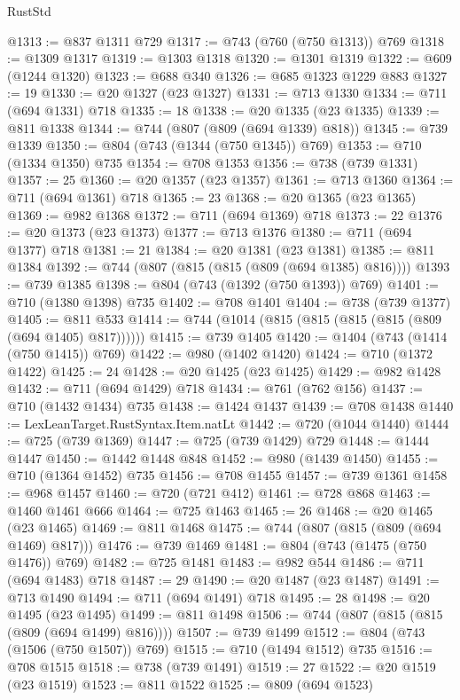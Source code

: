 \begin{lexlean}{RustStd}
\begin{coremodule}
@1313 := @837 @1311 @729
@1317 := @743 (@760 (@750 @1313)) @769
@1318 := @1309 @1317
@1319 := @1303 @1318
@1320 := @1301 @1319
@1322 := @609 (@1244 @1320)
@1323 := @688 @340
@1326 := @685 @1323 @1229 @883
@1327 := 19
@1330 := @20 @1327 (@23 @1327)
@1331 := @713 @1330
@1334 := @711 (@694 @1331) @718
@1335 := 18
@1338 := @20 @1335 (@23 @1335)
@1339 := @811 @1338
@1344 := @744 (@807 (@809 (@694 @1339) @818))
@1345 := @739 @1339
@1350 := @804 (@743 (@1344 (@750 @1345)) @769)
@1353 := @710 (@1334 @1350) @735
@1354 := @708 @1353
@1356 := @738 (@739 @1331)
@1357 := 25
@1360 := @20 @1357 (@23 @1357)
@1361 := @713 @1360
@1364 := @711 (@694 @1361) @718
@1365 := 23
@1368 := @20 @1365 (@23 @1365)
@1369 := @982 @1368
@1372 := @711 (@694 @1369) @718
@1373 := 22
@1376 := @20 @1373 (@23 @1373)
@1377 := @713 @1376
@1380 := @711 (@694 @1377) @718
@1381 := 21
@1384 := @20 @1381 (@23 @1381)
@1385 := @811 @1384
@1392 := @744 (@807 (@815 (@815 (@809 (@694 @1385) @816))))
@1393 := @739 @1385
@1398 := @804 (@743 (@1392 (@750 @1393)) @769)
@1401 := @710 (@1380 @1398) @735
@1402 := @708 @1401
@1404 := @738 (@739 @1377)
@1405 := @811 @533
@1414 := @744 (@1014 (@815 (@815 (@815 (@815 (@809 (@694 @1405) @817))))))
@1415 := @739 @1405
@1420 := @1404 (@743 (@1414 (@750 @1415)) @769)
@1422 := @980 (@1402 @1420)
@1424 := @710 (@1372 @1422)
@1425 := 24
@1428 := @20 @1425 (@23 @1425)
@1429 := @982 @1428
@1432 := @711 (@694 @1429) @718
@1434 := @761 (@762 @156)
@1437 := @710 (@1432 @1434) @735
@1438 := @1424 @1437
@1439 := @708 @1438
@1440 := LexLeanTarget.RustSyntax.Item.natLt
@1442 := @720 (@1044 @1440)
@1444 := @725 (@739 @1369)
@1447 := @725 (@739 @1429) @729
@1448 := @1444 @1447
@1450 := @1442 @1448 @848
@1452 := @980 (@1439 @1450)
@1455 := @710 (@1364 @1452) @735
@1456 := @708 @1455
@1457 := @739 @1361
@1458 := @968 @1457
@1460 := @720 (@721 @412)
@1461 := @728 @868
@1463 := @1460 @1461 @666
@1464 := @725 @1463
@1465 := 26
@1468 := @20 @1465 (@23 @1465)
@1469 := @811 @1468
@1475 := @744 (@807 (@815 (@809 (@694 @1469) @817)))
@1476 := @739 @1469
@1481 := @804 (@743 (@1475 (@750 @1476)) @769)
@1482 := @725 @1481
@1483 := @982 @544
@1486 := @711 (@694 @1483) @718
@1487 := 29
@1490 := @20 @1487 (@23 @1487)
@1491 := @713 @1490
@1494 := @711 (@694 @1491) @718
@1495 := 28
@1498 := @20 @1495 (@23 @1495)
@1499 := @811 @1498
@1506 := @744 (@807 (@815 (@815 (@809 (@694 @1499) @816))))
@1507 := @739 @1499
@1512 := @804 (@743 (@1506 (@750 @1507)) @769)
@1515 := @710 (@1494 @1512) @735
@1516 := @708 @1515
@1518 := @738 (@739 @1491)
@1519 := 27
@1522 := @20 @1519 (@23 @1519)
@1523 := @811 @1522
@1525 := @809 (@694 @1523)

\end{coremodule}
\end{lexlean}
